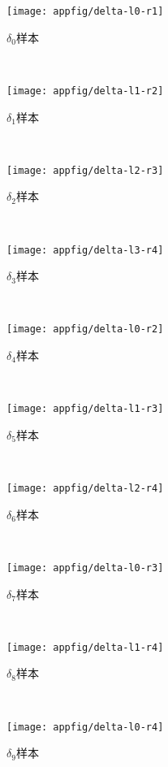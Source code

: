 {	\begin{appfig}[!htb]
		\centering
		\begin{subfigure}[b]{\twof\textwidth}
			\texttt{[image: appfig/delta-l0-r1]}
			\caption{$\delta_0$样本}
			\label{fig:delta01}
		\end{subfigure}%
		~%
		\begin{subfigure}[b]{\twof\textwidth}
			\texttt{[image: appfig/delta-l1-r2]}
			\caption{$\delta_1$样本}
			\label{fig:delta12}
		\end{subfigure}
		\\%
		\begin{subfigure}[b]{\twof\textwidth}
			\texttt{[image: appfig/delta-l2-r3]}
			\caption{$\delta_2$样本}
			\label{fig:delta23}
		\end{subfigure}%
		~%
		\begin{subfigure}[b]{\twof\textwidth}
			\texttt{[image: appfig/delta-l3-r4]}
			\caption{$\delta_3$样本}
			\label{fig:delta34}
		\end{subfigure}
		\\%
		\begin{subfigure}[b]{\twof\textwidth}
			\texttt{[image: appfig/delta-l0-r2]}
			\caption{$\delta_4$样本}
			\label{fig:delta02}
		\end{subfigure}%
		~%
		\begin{subfigure}[b]{\twof\textwidth}
			\texttt{[image: appfig/delta-l1-r3]}
			\caption{$\delta_5$样本}
			\label{fig:delta13}
		\end{subfigure}
		\\%
		\begin{subfigure}[b]{\twof\textwidth}
			\texttt{[image: appfig/delta-l2-r4]}
			\caption{$\delta_6$样本}
			\label{fig:delta24}
		\end{subfigure}%
		~%
		\begin{subfigure}[b]{\twof\textwidth}
			\texttt{[image: appfig/delta-l0-r3]}
			\caption{$\delta_7$样本}
			\label{fig:delta03}
		\end{subfigure}
		\\%
		\begin{subfigure}[b]{\twof\textwidth}
			\texttt{[image: appfig/delta-l1-r4]}
			\caption{$\delta_8$样本}
			\label{fig:delta14}
		\end{subfigure}%
		~%
		\begin{subfigure}[b]{\twof\textwidth}
			\texttt{[image: appfig/delta-l0-r4]}
			\caption{$\delta_9$样本}
			\label{fig:delta04}
		\end{subfigure}
		\\%
		

\end{appfig}}
